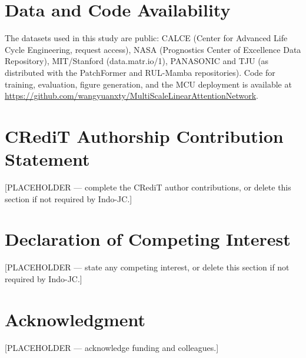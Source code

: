 \documentclass{indojc}
\begin{document}






\section*{Data and Code Availability}

The datasets used in this study are public: CALCE (Center for
Advanced Life Cycle Engineering, request access), NASA (Prognostics
Center of Excellence Data Repository), MIT/Stanford
(data.matr.io/1), PANASONIC and TJU (as distributed with the
PatchFormer and RUL-Mamba repositories). Code for training,
evaluation, figure generation, and the MCU deployment is available
at \url{https://github.com/wangyuanxty/MultiScaleLinearAttentionNetwork}.

\section*{CRediT Authorship Contribution Statement}

[PLACEHOLDER --- complete the CRediT author contributions, or delete
this section if not required by Indo-JC.]

\section*{Declaration of Competing Interest}

[PLACEHOLDER --- state any competing interest, or delete this section
if not required by Indo-JC.]

\section*{Acknowledgment}

[PLACEHOLDER --- acknowledge funding and colleagues.]



\end{document}
